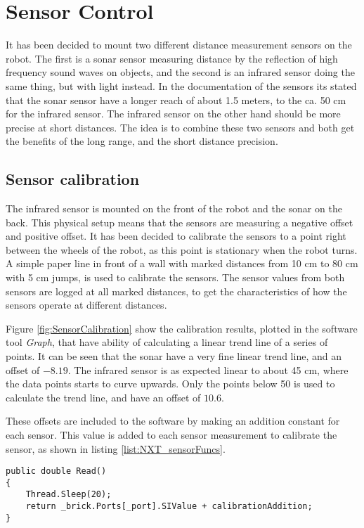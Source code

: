 
\section{Sensor Control}
\label{sec:sensorControl}

It has been decided to mount two different distance measurement sensors on the robot.
The first is a sonar sensor measuring distance by the reflection of high frequency sound waves on objects, and the second is an infrared sensor doing the same thing, but with light instead.
In the documentation of the sensors its stated that the sonar sensor have a longer reach of about 1.5 meters, to the ca. 50 cm for the infrared sensor.
The infrared sensor on the other hand should be more precise at short distances.
The idea is to combine these two sensors and both get the benefits of the long range, and the short distance precision.

\subsection{Sensor calibration}

The infrared sensor is mounted on the front of the robot and the sonar on the back.
This physical setup means that the sensors are measuring a negative offset and positive offset.
It has been decided to calibrate the sensors to a point right between the wheels of the robot, as this point is stationary when the robot turns.
A simple paper line in front of a wall with marked distances from 10 cm to 80 cm with 5 cm jumps, is used to calibrate the sensors.
The sensor values from both sensors are logged at all marked distances, to get the characteristics of how the sensors operate at different distances.

Figure \ref{fig:SensorCalibration} show the calibration results, plotted in the software tool \emph{Graph}, that have ability of calculating a linear trend line of a series of points.
It can be seen that the sonar have a very fine linear trend line, and an offset of $ -8.19 $.
The infrared sensor is as expected linear to about 45 cm, where the data points starts to curve upwards.
Only the points below 50 is used to calculate the trend line, and have an offset of $ 10.6 $.


These offsets are included to the software by making an addition constant for each sensor.
This value is added to each sensor measurement to calibrate the sensor, as shown in listing \ref{list:NXT_sensorFuncs}.

\begin{lstlisting}[caption={The function for reading and calibrate the sensor measurements, from the sensor class}, label=list:NXT_sensorFuncs]
public double Read()
{
	Thread.Sleep(20);
	return _brick.Ports[_port].SIValue + calibrationAddition;
}
\end{lstlisting}

\pagebreak